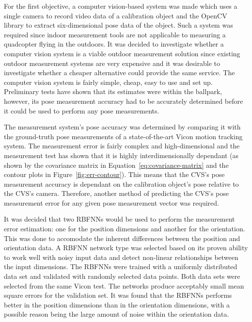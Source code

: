 For the first objective, a computer vision-based system was made which uses a single camera to record video data of a calibration object and the OpenCV library to extract six-dimensional pose data of the object. Such a system was required since indoor measurement tools are not applicable to measuring a quadcopter flying in the outdoors. It was decided to investigate whether a computer vision system is a viable outdoor measurement solution since existing outdoor measurement systems are very expensive and it was desirable to investigate whether a cheaper alternative could provide the same service. The computer vision system is fairly simple, cheap, easy to use and set up. Preliminary tests have shown that its estimates were within the ballpark, however, its pose measurement accuracy had to be accurately determined before it could be used to perform any pose measurements. 

The measurement system's pose accuracy was determined by comparing it with the ground-truth pose measurements of a state-of-the-art Vicon motion tracking system. The measurement error is fairly complex and high-dimensional and the measurement test has shown that it is highly interdimensionally dependant (as shown by the covariance matrix in Equation~\ref{eq:covariance-matrix} and the contour plots in Figure~\ref{fig:err-contour}). This means that the CVS's pose measurement accuracy is dependant on the calibration object's pose relative to the CVS's camera. Therefore, another method of predicting the CVS's pose measurement error for any given pose measurement vector was required.

It was decided that two RBFNNs would be used to perform the measurement error estimation: one for the position dimensions and another for the orientation. This was done to accomodate the inherent differences between the position and orientation data. A RBFNN network type was selected based on its proven ability to work well with noisy input data and detect non-linear relationships between the input dimensions. The RBFNNs were trained with a uniformly distributed data set and validated with randomly selected data points. Both data sets were selected from the same Vicon test. The networks produce acceptably small mean square errors for the validation set. It was found that the RBFNNs performs better in the position dimensions than in the orientation dimensions, with a possible reason being the large amount of noise within the orientation data. 

